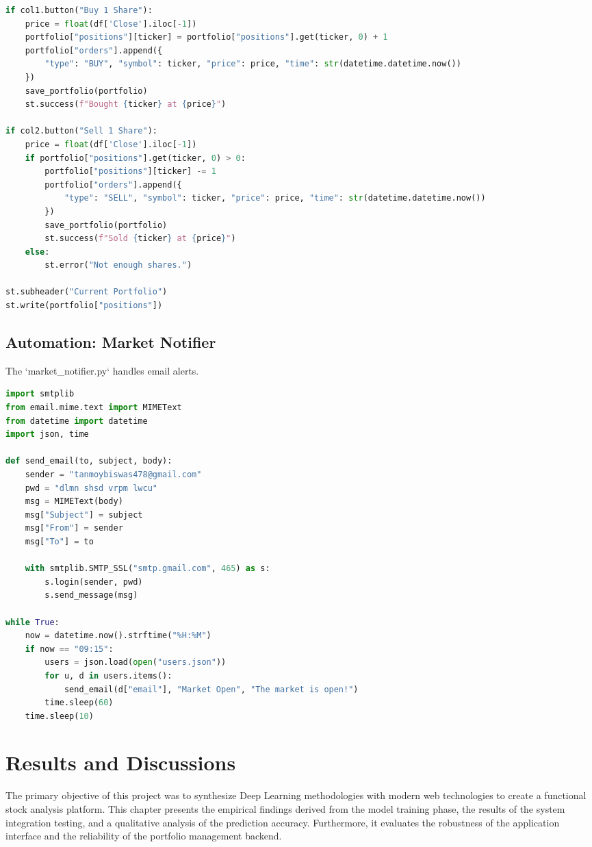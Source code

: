\documentclass[12pt, a4paper]{report}
\begin{document}
\begin{spacing}{1.2}
\begin{lstlisting}[language=Python, caption=Main Dashboard App (Part 2 - Trading Logic)]
if col1.button("Buy 1 Share"):
    price = float(df['Close'].iloc[-1])
    portfolio["positions"][ticker] = portfolio["positions"].get(ticker, 0) + 1
    portfolio["orders"].append({
        "type": "BUY", "symbol": ticker, "price": price, "time": str(datetime.datetime.now())
    })
    save_portfolio(portfolio)
    st.success(f"Bought {ticker} at {price}")

if col2.button("Sell 1 Share"):
    price = float(df['Close'].iloc[-1])
    if portfolio["positions"].get(ticker, 0) > 0:
        portfolio["positions"][ticker] -= 1
        portfolio["orders"].append({
            "type": "SELL", "symbol": ticker, "price": price, "time": str(datetime.datetime.now())
        })
        save_portfolio(portfolio)
        st.success(f"Sold {ticker} at {price}")
    else:
        st.error("Not enough shares.")

st.subheader("Current Portfolio")
st.write(portfolio["positions"])
\end{lstlisting}

\section{Automation: Market Notifier}
The `market\_notifier.py` handles email alerts.
\begin{lstlisting}[language=Python, caption=Automation Script]
import smtplib
from email.mime.text import MIMEText
from datetime import datetime
import json, time

def send_email(to, subject, body):
    sender = "tanmoybiswas478@gmail.com"
    pwd = "dlmn shsd vrpm lwcu"
    msg = MIMEText(body)
    msg["Subject"] = subject
    msg["From"] = sender
    msg["To"] = to
    
    with smtplib.SMTP_SSL("smtp.gmail.com", 465) as s:
        s.login(sender, pwd)
        s.send_message(msg)

while True:
    now = datetime.now().strftime("%H:%M")
    if now == "09:15":
        users = json.load(open("users.json"))
        for u, d in users.items():
            send_email(d["email"], "Market Open", "The market is open!")
        time.sleep(60)
    time.sleep(10)
\end{lstlisting}

\chapter{Results and Discussions}
The primary objective of this project was to synthesize Deep Learning methodologies with modern web technologies to create a functional stock analysis platform. This chapter presents the empirical findings derived from the model training phase, the results of the system integration testing, and a qualitative analysis of the prediction accuracy. Furthermore, it evaluates the robustness of the application interface and the reliability of the portfolio management backend.


\end{spacing}
\end{document}
